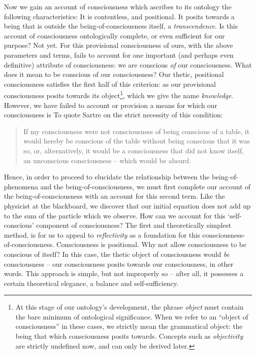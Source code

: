 Now we gain an account of consciousness which ascribes to its ontology the following characteristics: It is contentless, and positional. It posits towards a being that is outside the being-of-consciousness itself, a \emph{transcendence}. Is this account of consciousness ontologically complete, or even sufficient for our purpose? Not yet. For this provisional consciousness of ours, with the above parameters and terms, fails to account for one important (and perhaps even definitive) attribute of consciousness: we are conscious \emph{of} our consciousness. What does it mean to be conscious of our consciousness?  Our thetic, positional consciousness satisfies the first half of this criterion: as our provisional consciousness posits towards its object\footnote{At this stage of our ontology's development, the phrase \emph{object} must contain the bare minimum of ontological significance. When we refer to an \enquote{object of consciousness} in these cases, we strictly mean the grammatical object: the being that which consciousness posits towards. Concepts such as \emph{objectivity} are strictly undefined now, and can only be derived later.}, which we give the name \emph{knowledge}. However, we have failed to account or provision a means for which our consciousness is  To quote Sartre on the strict necessity of this condition:

\blockcquote[10]{Sartre}{If my consciousness were not consciousness of being conscious of a table, it would hereby be conscious of the table without being conscious that it was so, or, alternatively, it would be a consciousness that did not know itself, an unconscious consciousness -- which would be absurd.}

\noindent
Hence, in order to proceed to elucidate the relationship between the being-of-phenomena and the being-of-consciousness, we must first complete our account of the being-of-consciousness with an account for this second term. Like the physicist at the blackboard, we discover that our initial equation does not add up to the sum of the particle which we observe. How can we account for this \enquote*{self-conscious} component of consciousness? The first and theoretically simplest method, is for us to appeal to \emph{reflectivity} as a foundation for this consciousness-of-consciousness. Consciousness is positional. Why not allow consciousness to be conscious of itself? In this case, the thetic object of consciousness would \emph{be} consciousness -- our consciousness posits towards our consciousness, in other words. This approach is simple, but not improperly so -- after all, it possesses a certain theoretical elegance, a balance and self-sufficiency.

